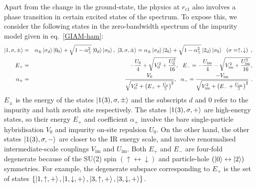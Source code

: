 \documentclass{iopart}
\begin{document}
Apart from the change in the ground-state, the physics at \(r_{c1}\) also involves a phase transition in certain excited states of the spectrum. To expose this, we consider the following states in the zero-bandwidth spectrum of the impurity model given in eq.~\eqref{GIAM-ham}:
\begin{eqnarray}\label{esqpt-1}
	\ket{1,\sigma,\pm} &=& \alpha_\pm \ket{\sigma_d}\ket{0_0} + \sqrt{1 - \alpha_\pm^2}\ket{0_d}\ket{\sigma_0}, ~\ket{3,\sigma,\pm} = \alpha_\pm \ket{\sigma_d}\ket{2_0} + \sqrt{1 - \alpha_\pm^2}\ket{2_d}\ket{\sigma_0} ~ ~\left(\sigma=\uparrow,\downarrow\right) ~,\nonumber\\
	E_+ &=& -\frac{U_0}{4} + \sqrt{V_0^2 + \frac{U_0^2}{16}}, ~~E_- = -\frac{U_\text{im}}{4} - \sqrt{V_{\text{im}}^2 + \frac{U_{\text{im}}^2}{16}},\nonumber \\
	\alpha_+ &=& \frac{V_0}{\sqrt{V_0^2 + \left(E_+ + \frac{U_0}{2}\right)^2 }}, ~ ~\alpha_- = \frac{-V_\text{im}}{\sqrt{V_\text{im}^2 + \left(E_- + \frac{U_{\text{im}}}{2}\right)^2}}~.\label{esqpt-2}
\end{eqnarray}
\(E_\pm\) is the energy of the states \(\ket{1(3),\sigma,\pm}\) and the subscripts $d$ and $0$ refer to the impurity and bath zeroth site respectively. The states \(\ket{1(3),\sigma,+}\) are high-energy states, so their energy \(E_+\) and coefficient \(\alpha_+\) involve the bare single-particle hybridisation \(V_0\) and impurity on-site repulsion $U_{0}$. On the other hand, the other states \(\ket{1(3),\sigma,-}\) are closer to the IR energy scale, and involve renormalised intermediate-scale couplings \(V_\text{im}\) and $U_{\text{im}}$. 
Both \(E_+\) and \(E_-\) are four-fold degenerate because of the SU(2) spin \((\uparrow \leftrightarrow \downarrow)\) and particle-hole \((\ket{0} \leftrightarrow \ket{2})\) symmetries. For example, the degenerate subspace corresponding to \(E_+\) is the set of states \(\left\{\ket{1,\uparrow,+}, \ket{1,\downarrow,+}, \ket{3,\uparrow,+}, \ket{3,\downarrow,+}\right\}\). 
\end{document}

